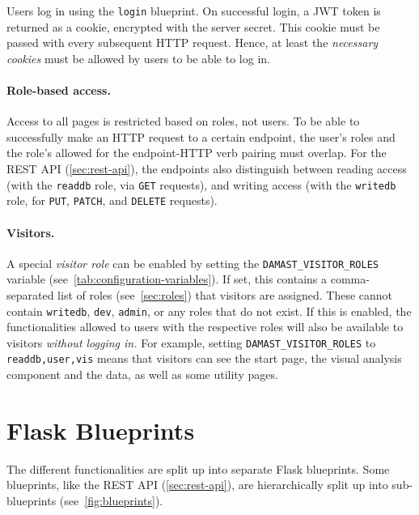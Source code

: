 Users log in using the \verb!login! blueprint.
On successful login, a JWT token is returned as a cookie, encrypted with the server secret.
This cookie must be passed with every subsequent HTTP request.
Hence, at least the \emph{necessary cookies} must be allowed by users to be able to log in.

\paragraph*{Role-based access.}
Access to all pages is restricted based on roles, not users.
To be able to successfully make an HTTP request to a certain endpoint, the user's roles and the role's allowed for the endpoint-HTTP verb pairing must overlap.
For the REST API (\cref{sec:rest-api}), the endpoints also distinguish between reading access (with the \verb!readdb! role, via \verb!GET! requests), and writing access (with the \verb!writedb! role, for \verb!PUT!, \verb!PATCH!, and \verb!DELETE! requests).

\paragraph*{Visitors.}
\label{sec:visitors}
A special \emph{visitor role} can be enabled by setting the \verb!DAMAST_VISITOR_ROLES! variable (see~\cref{tab:configuration-variables}).
If set, this contains a comma-separated list of roles (see~\cref{sec:roles}) that visitors are assigned.
These cannot contain \verb!writedb!, \verb!dev!, \verb!admin!, or any roles that do not exist.
If this is enabled, the functionalities allowed to users with the respective roles will also be available to visitors \emph{without logging in.}
For example, setting \verb!DAMAST_VISITOR_ROLES! to \verb!readdb,user,vis! means that visitors can see the start page, the visual analysis component and the data, as well as some utility pages.


\section{Flask Blueprints}
\label{sec:blueprints}

The different functionalities are split up into separate Flask blueprints.
Some blueprints, like the REST API (\cref{sec:rest-api}), are hierarchically split up into sub-blueprints (see~\cref{fig:blueprints}).

